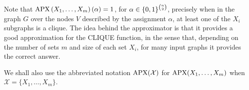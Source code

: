 Note that $\mathrm{APX}\left(X_1, \ldots, X_m\right)(\alpha)=1$, for $\alpha\in\{0,1\}^{n\choose 2}$, precisely when in the graph $G$ over the nodes $V$ described by the assignment $\alpha$, at least one of the $X_i$ subgraphs is a clique. The idea behind the approximator is that it provides a good approximation for the CLIQUE function, in the sense that, depending on the number of sets $m$ and size of each set $X_i$, for many  input graphs it provides the correct answer.   

We shall also use the abbreviated notation $\mathrm{APX}(\mathcal X)$ for $\mathrm{APX}(X_1,\dots,X_m)$ when $\mathcal X = \{X_1,\dots,X_m\}$.


